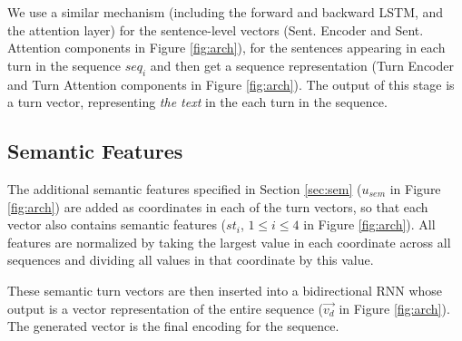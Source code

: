 We use a similar mechanism (including the forward and backward 
LSTM, and the attention layer) for the sentence-level vectors (Sent. Encoder and Sent. Attention components in Figure \ref{fig:arch}), 
for the sentences appearing in each turn in the sequence $seq_i$ and then get a sequence representation 
(Turn Encoder and Turn Attention components in Figure \ref{fig:arch}).
The output of this stage is a turn vector, representing {\em the text} in the each turn in the sequence. 

\subsection{Semantic Features}
The additional semantic features specified 
in Section \ref{sec:sem} ($u_{sem}$ in Figure \ref{fig:arch})
are added as coordinates in each of the turn vectors, 
so that each vector also contains semantic features  ($st_i$, $1\leq i \leq 4$ in Figure \ref{fig:arch}). 
All features are normalized by taking the largest 
value in each coordinate across all sequences and dividing 
all values in that coordinate by this value. 

These semantic turn vectors are then inserted into a bidirectional RNN whose output 
is a vector representation of the entire sequence ($\vec{v_d}$ in Figure \ref{fig:arch}). 
The generated vector is the final encoding for the sequence.









